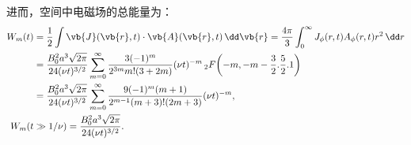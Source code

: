 \begin{exbox}
	进而，空间中电磁场的总能量为：
	\begin{align*}
		W_m(t) & = \frac12 \int \vb{J}(\vb{r},t) \cdot \vb{A}(\vb{r},t) \,\dd \vb{r}
		= \frac{4\pi}{3} \int_0^\infty J_\phi(r,t) A_\phi(r,t) r^2 \,\dd r                                                                                                            \\
		       & = \frac{B_0^2 a^3 \sqrt{2\pi}}{24 (\nu t)^{3/2}} \sum_{m=0}^\infty \frac{3(-1)^m}{2^{3m} m! (3+2m)} (\nu t)^{-m}\, _2F\!\left(-m, -m-\frac32. \frac52. 1\right) \\
		       & = \frac{B_0^2 a^3 \sqrt{2\pi}}{24 (\nu t)^{3/2}} \sum_{m=0}^\infty \frac{9(-1)^m (m+1)}{2^{m-1} (m+3)! (2m+3)} (\nu t)^{-m},                                    \\
		W_m(t  & \gg 1/\nu) = \frac{B_0^2 a^3 \sqrt{2\pi}}{24 (\nu t)^{3/2}}.
	\end{align*}
\end{exbox}

